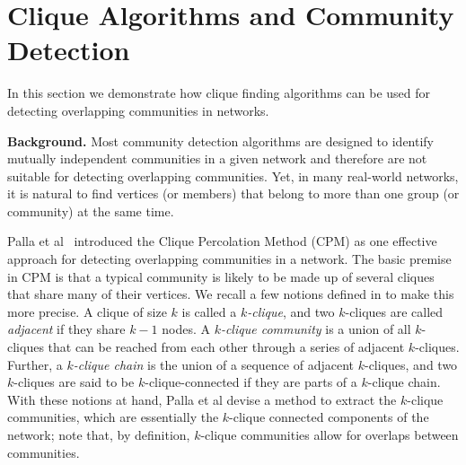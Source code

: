 \section{Clique Algorithms and Community Detection}
\label{sec:applications}

In this section we demonstrate how clique finding algorithms can be used for detecting overlapping communities in networks. 


{\bf Background. }
Most community detection algorithms are designed to identify mutually independent communities in a given network and therefore are not suitable for detecting overlapping communities. Yet, in many real-world networks, it is natural to find vertices (or members) that belong to more than one group (or community) at the same time.

Palla et al~\cite{cite-key} introduced the Clique Percolation Method (CPM) 
as one effective approach for detecting overlapping communities in a network. 
The basic premise in CPM is that a typical community is likely to be made up of several cliques that share many of their vertices.  
We recall a few notions defined in \cite{cite-key} to make this more precise.
A clique of size $k$ is called a {\em $k$-clique}, and   
two $k$-cliques are called {\em adjacent} if they share $k - 1$ nodes. 
A {\em $k$-clique community} is a union of all $k$-cliques that can be reached 
from each other through a series of adjacent $k$-cliques. 
Further, a {\em $k$-clique chain} is the union of a sequence of adjacent $k$-cliques, and
two $k$-cliques are said to be $k$-clique-connected if they are parts of a $k$-clique chain. With these notions at hand, Palla et al devise a method to extract the $k$-clique communities, which  are essentially the $k$-clique connected components of the network; 
note that, by definition, $k$-clique communities allow for
overlaps between communities.


